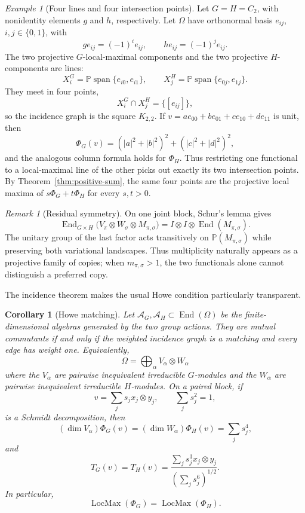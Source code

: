 \documentclass[10pt]{amsart}
\newtheorem{corollary}[theorem]{Corollary}
\theoremstyle{remark}
\newtheorem{remark}[theorem]{Remark}
\newtheorem{example}[theorem]{Example}
\DeclareMathOperator{\End}{End}
\DeclareMathOperator{\Span}{span}
\DeclareMathOperator{\LocMax}{LocMax}
\newcommand{\PP}{\mathbb P}
\begin{document}
\begin{example}[Four lines and four intersection points]\label{ex:square}
Let $G=H=C_2$, with nonidentity elements $g$ and $h$, respectively.
Let $\Omega$ have orthonormal basis $e_{ij}$, $i,j\in\{0,1\}$, with
\[
 g e_{ij}=(-1)^i e_{ij},
 \qquad
 h e_{ij}=(-1)^j e_{ij}.
\]
The two projective $G$-local-maximal components and the two projective $H$-components are lines:
\[
 X_i^G=\PP\Span\{e_{i0},e_{i1}\},
 \qquad
 X_j^H=\PP\Span\{e_{0j},e_{1j}\}.
\]
They meet in four points,
\[
 X_i^G\cap X_j^H=\{[e_{ij}]\},
\]
so the incidence graph is the square $K_{2,2}$. If
$v=ae_{00}+be_{01}+ce_{10}+de_{11}$ is unit, then
\[
 \Phi_G(v)
 =(|a|^2+|b|^2)^2+(|c|^2+|d|^2)^2,
\]
and the analogous column formula holds for $\Phi_H$. Thus restricting one functional to a local-maximal
line of the other picks out exactly its two intersection points. By Theorem~\ref{thm:positive-sum}, the
same four points are the projective local maxima of $s\Phi_G+t\Phi_H$ for every $s,t>0$.
\end{example}

\begin{remark}[Residual symmetry]\label{rem:residual}
On one joint block, Schur's lemma gives
\[
 \End_{G\times H}
 \bigl(V_\pi\otimes W_\sigma\otimes M_{\pi,\sigma}\bigr)
 =I\otimes I\otimes\End(M_{\pi,\sigma}).
\]
The unitary group of the last factor acts transitively on $\PP(M_{\pi,\sigma})$ while preserving both
variational landscapes. Thus multiplicity naturally appears as a projective family of copies; when
$m_{\pi,\sigma}>1$, the two functionals alone cannot distinguish a preferred copy.
\end{remark}

The incidence theorem makes the usual Howe condition particularly transparent.

\begin{corollary}[Howe matching]\label{cor:howe}
Let $\mathcal A_G,\mathcal A_H\subset\End(\Omega)$ be the finite-dimensional algebras generated by
the two group actions. They are mutual commutants if and only if the weighted incidence graph is a matching and
every edge has weight one. Equivalently,
\[
 \Omega=\bigoplus_\alpha V_\alpha\otimes W_\alpha
\]
where the $V_\alpha$ are pairwise inequivalent irreducible
$G$-modules and the $W_\alpha$ are pairwise inequivalent
irreducible $H$-modules.
On a paired block, if
\[
 v=\sum_j s_jx_j\otimes y_j,
 \qquad \sum_j s_j^2=1,
\]
is a Schmidt decomposition, then
\begin{equation}\label{eq:schmidt-purity}
 (\dim V_\alpha)\Phi_G(v)
 =(\dim W_\alpha)\Phi_H(v)
 =\sum_j s_j^4,
\end{equation}
and
\begin{equation}\label{eq:schmidt-map}
 T_G(v)=T_H(v)
 =\frac{\sum_j s_j^3x_j\otimes y_j}{(\sum_j s_j^6)^{1/2}}.
\end{equation}
In particular,
\[
 \LocMax(\Phi_G)=\LocMax(\Phi_H).
\]
\end{corollary}
\end{document}
